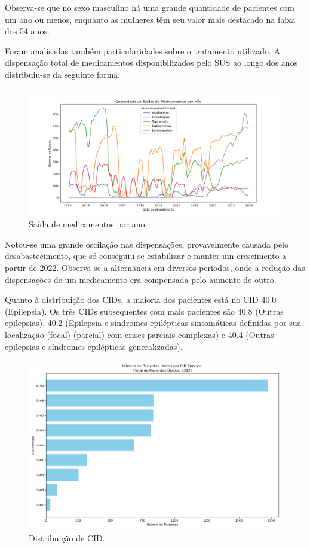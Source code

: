 \documentclass[article,a4paper,12pt,brazil,sumario=tradicional]{abntex2}
\begin{document}
Observa-se que no sexo masculino há uma grande quantidade de pacientes com um ano ou menos, enquanto as mulheres têm seu valor mais destacado na faixa dos 54 anos.

Foram analisadas também particularidades sobre o tratamento utilizado. A dispensação total de medicamentos disponibilizados pelo SUS ao longo dos anos distribuiu-se da seguinte forma:

\begin{figure}[!ht]
    \centering
    \includegraphics[width=1\textwidth]{saida_medicamentos_por_mes.png}
    \caption{Saída de medicamentos por ano.}
    \label{fig:saida_medicamentos_por_mes}
\end{figure}

Notou-se uma grande oscilação nas dispensações, provavelmente causada pelo desabastecimento, que só conseguiu se estabilizar e manter um crescimento a partir de 2022. Observa-se a alternância em diversos períodos, onde a redução das dispensações de um medicamento era compensada pelo aumento de outro.

Quanto à distribuição dos CIDs, a maioria dos pacientes está no CID 40.0 (Epilepsia). Os três CIDs subsequentes com mais pacientes são 40.8 (Outras epilepsias), 40.2 (Epilepsia e síndromes epilépticas sintomáticas definidas por sua localização (focal) (parcial) com crises parciais complexas) e 40.4 (Outras epilepsias e síndromes epilépticas generalizadas). 


\begin{figure}[!ht]
    \centering
    \includegraphics[width=1\textwidth]{contagem_cid_pacientes_unicos.png}
    \caption{Distribuição de CID.}
    \label{fig:contagem_cid_pacientes_unicos}
\end{figure}
\end{document}
